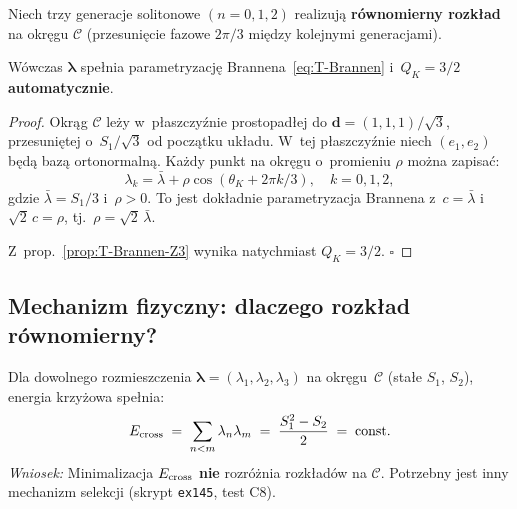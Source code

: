 \begin{theorem}[$Q_K = 3/2$ z~optymalnego rozk\l{}adu na okr\k{e}gu]%
\label{thm:R2-QK-circle}
Niech trzy generacje solitonowe $(n=0,1,2)$
realizuj\k{a} \textbf{r\'ownomierny rozk\l{}ad} na okr\k{e}gu
$\mathcal{C}$ (przesuni\k{e}cie fazowe $2\pi/3$ mi\k{e}dzy
kolejnymi generacjami).

W\'owczas $\boldsymbol{\lambda}$ spe\l{}nia
parametryzacj\k{e} Brannena~\eqref{eq:T-Brannen}
i~$Q_K = 3/2$ \textbf{automatycznie}.

\begin{proof}
Okr\k{a}g $\mathcal{C}$ le\.zy w~p\l{}aszczy\'znie prostopad\l{}ej
do $\mathbf{d} = (1,1,1)/\sqrt{3}$, przesuni\k{e}tej
o~$S_1/\sqrt{3}$ od pocz\k{a}tku uk\l{}adu.
W~tej p\l{}aszczy\'znie niech $(e_1, e_2)$ b\k{e}d\k{a}
baz\k{a} ortonormaln\k{a}. Ka\.zdy punkt na okr\k{e}gu
o~promieniu $\rho$ mo\.zna zapisa\'c:
\begin{equation}
  \lambda_k = \bar\lambda + \rho\cos(\theta_K + 2\pi k/3),
  \quad k = 0, 1, 2,
\end{equation}
gdzie $\bar\lambda = S_1/3$ i~$\rho > 0$.
To jest dok\l{}adnie parametryzacja Brannena
z~$c = \bar\lambda$ i~$\sqrt{2}\,c = \rho$, tj.~$\rho = \sqrt{2}\,\bar\lambda$.

Z~prop.~\ref{prop:T-Brannen-Z3} wynika natychmiast $Q_K = 3/2$.
\hfill$\square$
\end{proof}
\end{theorem}

\subsection{Mechanizm fizyczny: dlaczego rozk\l{}ad r\'ownomierny?}

\begin{lemma}%
\label{lem:R2-Ecross-const}
Dla dowolnego rozmieszczenia
$\boldsymbol{\lambda} = (\lambda_1,\lambda_2,\lambda_3)$
na okr\k{e}gu~$\mathcal{C}$ (sta\l{}e $S_1$, $S_2$),
energia krzy\.zowa spe\l{}nia:
\begin{equation}
  E_{\rm cross} \;=\; \sum_{n<m}\lambda_n\lambda_m
  \;=\; \frac{S_1^2 - S_2}{2}
  \;=\; \mathrm{const}.
\end{equation}
\emph{Wniosek:} Minimalizacja $E_{\rm cross}$ \textbf{nie}
rozr\'o\.znia rozk\l{}ad\'ow na $\mathcal{C}$.
Potrzebny jest inny mechanizm selekcji
(skrypt \texttt{ex145}, test C8).
\end{lemma}

